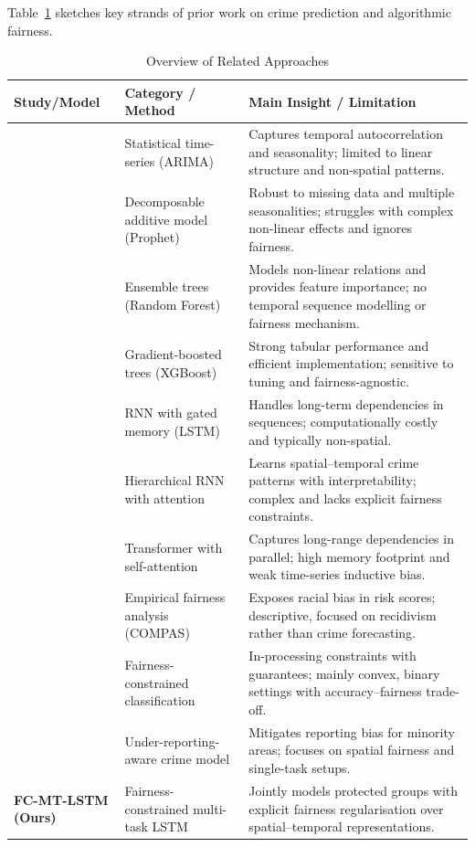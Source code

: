 \documentclass{svproc}
\newcommand{\modelname}{FC-MT-LSTM}
\begin{document}
Table~\ref{tab:literature_survey} sketches key strands of prior work on crime prediction and algorithmic fairness.

\begin{table}[htbp]
\caption{Overview of Related Approaches}
\label{tab:literature_survey}
\centering
\renewcommand{\arraystretch}{1.1}
\begin{tabular}{p{2.2cm}p{3cm}p{4.2cm}}
\toprule
\textbf{Study/Model} & \textbf{Category / Method} & \textbf{Main Insight / Limitation} \\
\midrule
\cite{box2015time} &
Statistical time-series (ARIMA) &
Captures temporal autocorrelation and seasonality; limited to linear structure and non-spatial patterns. \\
\midrule
\cite{taylor2018forecasting} &
Decomposable additive model (Prophet) &
Robust to missing data and multiple seasonalities; struggles with complex non-linear effects and ignores fairness. \\
\midrule
\cite{breiman2001random} &
Ensemble trees (Random Forest) &
Models non-linear relations and provides feature importance; no temporal sequence modelling or fairness mechanism. \\
\midrule
\cite{chen2016xgboost} &
Gradient-boosted trees (XGBoost) &
Strong tabular performance and efficient implementation; sensitive to tuning and fairness-agnostic. \\
\midrule
\cite{hochreiter1997long} &
RNN with gated memory (LSTM) &
Handles long-term dependencies in sequences; computationally costly and typically non-spatial. \\
\midrule
\cite{huang2018deepcrime} &
Hierarchical RNN with attention &
Learns spatial–temporal crime patterns with interpretability; complex and lacks explicit fairness constraints. \\
\midrule
\cite{vaswani2017attention} &
Transformer with self-attention &
Captures long-range dependencies in parallel; high memory footprint and weak time-series inductive bias. \\
\midrule
\cite{angwin2016machine} &
Empirical fairness analysis (COMPAS) &
Exposes racial bias in risk scores; descriptive, focused on recidivism rather than crime forecasting. \\
\midrule
\cite{zafar2017fairness} &
Fairness-constrained classification &
In-processing constraints with guarantees; mainly convex, binary settings with accuracy–fairness trade-off. \\
\midrule
\cite{wu2024improving} &
Under-reporting-aware crime model &
Mitigates reporting bias for minority areas; focuses on spatial fairness and single-task setups. \\
\midrule
\textbf{\modelname{} (Ours)} &
Fairness-constrained multi-task LSTM &
Jointly models protected groups with explicit fairness regularisation over spatial–temporal representations. \\
\bottomrule
\end{tabular}
\end{table}
\end{document}
